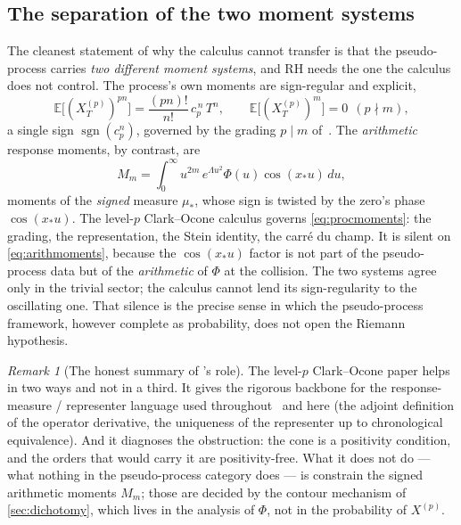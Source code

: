 \documentclass[11pt,reqno]{amsart}
\theoremstyle{plain}
\theoremstyle{definition}
\theoremstyle{remark}
\newtheorem{remark}[theorem]{Remark}
\newcommand{\E}{\mathbb E}
\DeclareMathOperator{\sgn}{sgn}
\begin{document}
\subsection{The separation of the two moment systems}
The cleanest statement of why the calculus cannot transfer is that the
pseudo-process carries \emph{two different moment systems}, and RH needs the
one the calculus does not control. The process's own moments are
sign-regular and explicit,
\begin{equation}\label{eq:procmoments}
  \E\bigl[(X^{(p)}_T)^{pn}\bigr]=\frac{(pn)!}{n!}\,c_p^{\,n}\,T^n,
  \qquad \E\bigl[(X^{(p)}_T)^{m}\bigr]=0\ \ (p\nmid m),
\end{equation}
a single sign $\sgn(c_p^n)$, governed by the grading $p\mid m$
of~\cite{Fpseudo}. The \emph{arithmetic} response moments, by contrast, are
\begin{equation}\label{eq:arithmoments}
  M_m=\int_0^\infty u^{2m}\,e^{\Lambda u^2}\Phi(u)\cos(x_*u)\,du,
\end{equation}
moments of the \emph{signed} measure $\mu_*$, whose sign is twisted by the
zero's phase $\cos(x_*u)$. The level-$p$ Clark--Ocone calculus governs
\eqref{eq:procmoments}: the grading, the representation, the Stein identity,
the carr\'e du champ. It is silent on \eqref{eq:arithmoments}, because the
$\cos(x_*u)$ factor is not part of the pseudo-process data but of the
\emph{arithmetic} of $\Phi$ at the collision. The two systems agree only in
the trivial sector; the calculus cannot lend its sign-regularity to the
oscillating one. That silence is the precise sense in which the
pseudo-process framework, however complete as probability, does not open the
Riemann hypothesis.

\begin{remark}[The honest summary of {\cite{Fpseudo}}'s role]
\label{rem:honest}
The level-$p$ Clark--Ocone paper helps in two ways and not in a third. It
gives the rigorous backbone for the response-measure / representer language
used throughout~\cite{Fsymbol} and here (the adjoint definition of the
operator derivative, the uniqueness of the representer up to chronological
equivalence). And it diagnoses the obstruction: the cone is a positivity
condition, and the orders that would carry it are positivity-free. What it
does not do --- what nothing in the pseudo-process category does --- is
constrain the signed arithmetic moments $M_m$; those are decided by the
contour mechanism of \cref{sec:dichotomy}, which lives in the analysis of
$\Phi$, not in the probability of $X^{(p)}$.
\end{remark}
\end{document}
